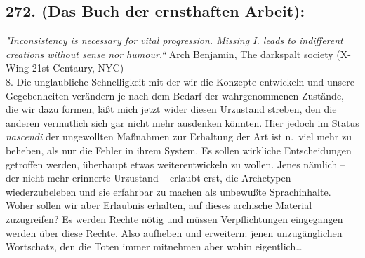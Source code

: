 \documentclass[
]{article}
\author{}
\date{\vspace{-2.5em}}
\begin{document}
\subsection{272. (Das Buch der ernsthaften
Arbeit):}\label{das-buch-der-ernsthaften-arbeit}

\emph{"Inconsistency is necessary for vital progression. Missing I.
leads to indifferent creations without sense nor humour.`` }Arch
Benjamin, The darkspalt society (X-Wing 21st Centaury, NYC)\\
8. Die unglaubliche Schnelligkeit mit der wir die Konzepte entwickeln
und unsere Gegebenheiten verändern je nach dem Bedarf der wahrgenommenen
Zustände, die wir dazu formen, läßt mich jetzt wider diesen Urzustand
streben, den die anderen vermutlich sich gar nicht mehr ausdenken
könnten. Hier jedoch im Status \emph{nascendi} der ungewollten Maßnahmen
zur Erhaltung der Art ist n.~viel mehr zu beheben, als nur die Fehler in
ihrem System. Es sollen wirkliche Entscheidungen getroffen werden,
überhaupt etwas weiterentwickeln zu wollen. Jenes nämlich -- der nicht
mehr erinnerte Urzustand -- erlaubt erst, die Archetypen wiederzubeleben
und sie erfahrbar zu machen als unbewußte Sprachinhalte. Woher sollen
wir aber Erlaubnis erhalten, auf dieses archische Material zuzugreifen?
Es werden Rechte nötig und müssen Verpflichtungen eingegangen werden
über diese Rechte. Also aufheben und erweitern: jenen unzugänglichen
Wortschatz, den die Toten immer mitnehmen aber wohin eigentlich\ldots{}
\end{document}
